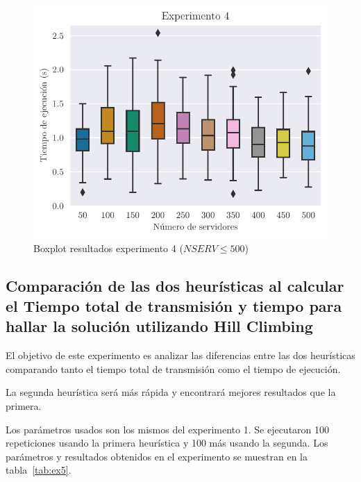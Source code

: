 \begin{figure}[H]
    \centering
    \includegraphics{include/plots/ex4_s_time_bplot.pdf}
    \caption{Boxplot resultados experimento 4 ($NSERV \leq 500$)}%
    \label{fig:ex4s}
\end{figure}

\pagebreak

\subsection{Comparación de las dos heurísticas al calcular el Tiempo total de transmisión y tiempo para hallar la solución utilizando Hill Climbing}
\label{sub:diffHC}

El objetivo de este experimento es analizar las diferencias entre las dos heurísticas comparando
tanto el tiempo total de transmisión como el tiempo de ejecución.

\begin{hyp*}
La segunda heurística será más rápida y encontrará mejores resultados que la primera.
\end{hyp*} %

Los parámetros usados son los mismos del experimento 1.
Se ejecutaron 100 repeticiones usando la primera heurística y 100 más usando la segunda.
Los parámetros y resultados obtenidos en el experimento se muestran en la tabla~\ref{tab:ex5}.

